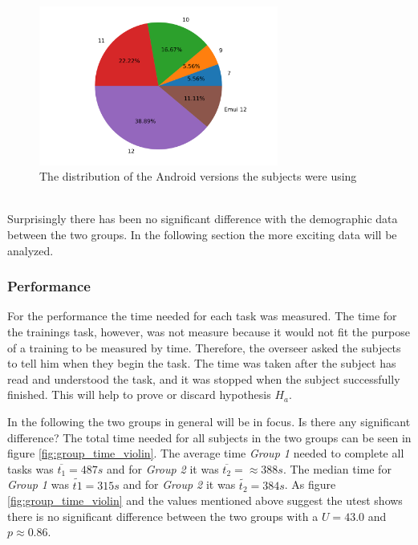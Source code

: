 \begin{figure}[htb]
  \centering
  \includegraphics[width=0.7\textwidth]{Evaluation/img/droid_version.png}
  \caption{The distribution of the Android versions the subjects were using}\label{fig:android_version}
\end{figure}

\mbox{}\\
Surprisingly there has been no significant difference with the demographic data between the two groups.
In the following section the more exciting data will be analyzed. 

\subsubsection{Performance}
For the performance the time needed for each task was measured.
The time for the trainings task, however, was not measure because it would not fit the purpose of a training to be measured by time.
Therefore, the overseer asked the subjects to tell him when they begin the task. 
The time was taken after the subject has read and understood the task, and it was stopped when the subject successfully finished.
This will help to prove or discard hypothesis $H_{a}$.

In the following the two groups in general will be in focus.
Is there any significant difference?
The total time needed for all subjects in the two groups can be seen in figure \ref{fig:group_time_violin}.
The average time \textit{Group 1} needed to complete all tasks was $\overline{t_1} = 487s$ and for \textit{Group 2} it was $\overline{t_2} = \approx388s$.
The median time for \textit{Group 1} was $\widetilde{t1} = 315s$ and for \textit{Group 2} it was $\widetilde{t_2} = 384s$.
As figure \ref{fig:group_time_violin} and the values mentioned above suggest the \gls{utest} shows there is no significant difference between the two groups with a $U = 43.0$ and $p \approx 0.86$.


